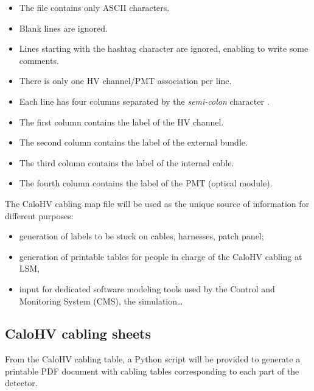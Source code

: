 \begin{itemize}
\item The file contains only ASCII characters.
\item Blank lines are ignored.
\item Lines starting with the hashtag character \fbox{\texttt{\#}} are
  ignored, enabling to write some comments.
\item There is only one HV channel/PMT association per line.
\item Each  line has  four columns  separated by  the \emph{semi-colon}
  character \fbox{\texttt{;}}.
\item The first column contains the label of the HV channel.
\item The second column contains the label of the external bundle.
\item The third column contains the label of the internal cable.
\item The fourth column contains the label of the PMT (optical module).
\end{itemize}

\par\noindent The  CaloHV cabling  map file  will be  used as  the unique
source of information for different purposes:
\begin{itemize}
\item generation of labels to be stuck on cables, harnesses, patch panel;
\item generation of  printable tables for people in charge  of the CaloHV
  cabling at LSM,
\item input for dedicated software  modeling tools used by the
  Control and Monitoring System (CMS), the simulation\dots 
\end{itemize}


\subsection{CaloHV cabling sheets}


From  the CaloHV  cabling  table, a  Python script  will  be provided  to
generate a printable PDF document with cabling tables corresponding to
each  part of  the  detector.





